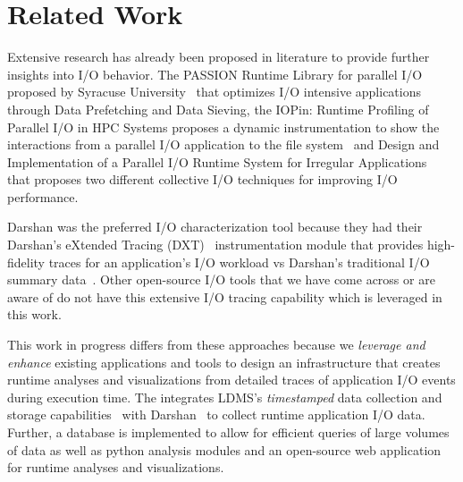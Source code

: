 \section{Related Work}
\label{sec:rw}
Extensive research has already been proposed in literature to provide further insights into I/O behavior. The PASSION Runtime Library for parallel I/O proposed by Syracuse University~\cite{RuntimeLibrary-ParallelI/O} that optimizes I/O intensive applications through Data Prefetching and Data Sieving, the IOPin: Runtime Profiling of Parallel I/O in HPC
Systems proposes a dynamic instrumentation to show the interactions from a parallel I/O application to the file system~\cite{HPC-IO-Runtime} and Design and Implementation of a Parallel I/O Runtime System for Irregular Applications~\cite{RuntimeLibrary-IrregularApps} that proposes two different collective I/O techniques for improving I/O performance.

Darshan was the preferred I/O characterization tool because they had their Darshan's eXtended Tracing (DXT)~\cite{darshan-runtime} instrumentation module that provides high-fidelity traces for an application's I/O workload vs Darshan's traditional I/O summary data~\cite{darshan-runtime}. Other open-source I/O tools that we have come across or are aware of do not have this extensive I/O tracing capability which is leveraged in this work.

This work in progress differs from these approaches because we \emph{leverage and enhance} existing applications and tools to design an infrastructure that creates runtime analyses and visualizations from detailed traces of application I/O events during execution time. The \Darshan{} integrates LDMS's \emph{timestamped} data collection and storage capabilities~\cite{ldmsgithub} with Darshan~\cite{darshan-webpage} to collect runtime application I/O data. Further, a database is implemented to allow for efficient queries of large volumes of data as well as python analysis modules and an open-source web application for runtime analyses and visualizations.
